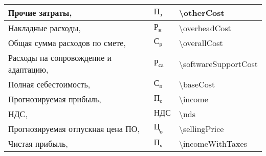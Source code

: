 \begin{table}[!h!t]
\begin{tabular}{| >{\raggedright}m{}
                  | >{\centering}m{}
                  | >{\centering\arraybackslash}m{}|}
    \hline
    Прочие затраты, \byr{} & $ \text{П}_\text{з} $ & \num{\otherCost} \\

    \hline
    Накладные расходы, \byr{} & $ \text{Р}_\text{н} $ & \num{\overheadCost} \\

    \hline
    Общая сумма расходов по смете, \byr{} & $ \text{С}_\text{р} $ & \num{\overallCost} \\

    \hline
    Расходы на сопровождение и адаптацию, \byr{} & $ \text{Р}_\text{са} $ & \num{\softwareSupportCost} \\

    \hline
    Полная себестоимость, \byr{} & $ \text{С}_\text{п} $ & \num{\baseCost} \\

    \hline
    Прогнозируемая прибыль, \byr{} & $ \text{П}_\text{с} $ & \num{\income} \\

    \hline
    НДС, \byr{} & $ \text{НДС} $ & \num{\nds} \\

    \hline
    Прогнозируемая отпускная цена ПО, \byr{} & $ \text{Ц}_\text{о} $ & \num{\sellingPrice} \\

    \hline
    Чистая прибыль, \byr{} & $ \text{П}_\text{ч} $ & \num{\incomeWithTaxes} \\

    \hline
  \end{tabular}
\end{table}
\hfill
\clearpage


